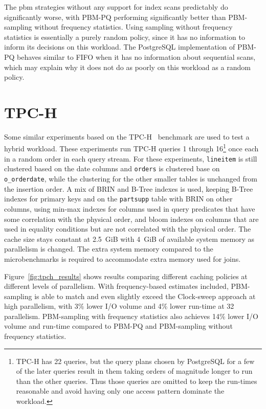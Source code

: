 The \gls{pbm} strategies without any support for index scans predictably do significantly worse, with PBM-PQ performing significantly better than PBM-sampling without frequency statistics. Using sampling without frequency statistics is essentially a purely random policy, since it has no information to inform its decisions on this workload. The PostgreSQL implementation of PBM-PQ behaves similar to FIFO when it has no information about sequential scans, which may explain why it does not do as poorly on this workload as a random policy.


\section{TPC-H}

Some similar experiments based on the TPC-H~\cite{tpch} benchmark are used to test a hybrid workload. These experiments run TPC-H queries 1 through 16\footnote{TPC-H has 22 queries, but the query plans chosen by PostgreSQL for a few of the later queries result in them taking orders of magnitude longer to run than the other queries. Thus those queries are omitted to keep the run-times reasonable and avoid having only one access pattern dominate the workload.} once each in a random order in each query stream. For these experiments, \verb|lineitem| is still clustered based on the date columns and \verb|orders| is clustered base on \verb|o_orderdate|, while the clustering for the other smaller tables is unchanged from the insertion order. A mix of BRIN and B-Tree indexes is used, keeping B-Tree indexes for primary keys and on the \verb|partsupp| table with BRIN on other columns, using min-max indexes for columns used in query predicates that have some correlation with the physical order, and bloom indexes on columns that are used in equality conditions but are not correlated with the physical order. The cache size stays constant at 2.5~GiB with 4~GiB of available system memory as parallelism is changed. The extra system memory compared to the microbenchmarks is required to accommodate extra memory used for joins.

Figure~\ref{fig:tpch_results} shows results comparing different caching policies at different levels of parallelism. With frequency-based estimates included, PBM-sampling is able to match and even slightly exceed the Clock-sweep approach at high parallelism, with 3\% lower I/O volume and 4\% lower run-time at 32 parallelism. PBM-sampling with frequency statistics also achieves 14\% lower I/O volume and run-time compared to PBM-PQ and PBM-sampling without frequency statistics.


